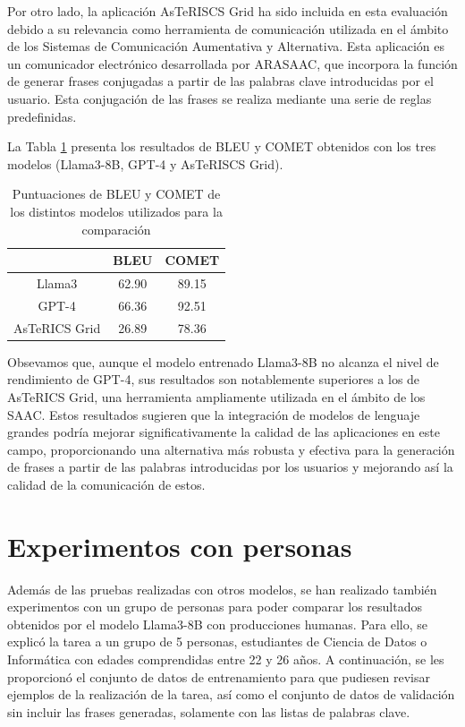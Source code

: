 \documentclass[11pt,spanish,listoffigures,listoftables]{tfgetsinf}
\begin{document}
Por otro lado, la aplicación AsTeRISCS Grid ha sido incluida en esta evaluación debido a su relevancia como herramienta de comunicación utilizada en el ámbito de los Sistemas de Comunicación Aumentativa y Alternativa. Esta aplicación es un comunicador electrónico desarrollada por ARASAAC, que incorpora la función de generar frases conjugadas a partir de las palabras clave introducidas por el usuario. Esta conjugación de las frases se realiza mediante una serie de reglas predefinidas.

La Tabla \ref{tab:comparacionFinal} presenta los resultados de BLEU y COMET obtenidos con los tres modelos (Llama3-8B, GPT-4 y AsTeRISCS Grid).

\begin{table}[!h]
\caption{Puntuaciones de BLEU y COMET de los distintos modelos utilizados para la comparación}
\begin{center}
\begin{tabular}{ c | c c }
	\ & BLEU & COMET \\
	\hline
	\hline
	Llama3 & 62.90 & 89.15  \\
	GPT-4 & 66.36 & 92.51\\
	AsTeRICS Grid & 26.89 & 78.36 \\

\end{tabular}
\end{center}
\label{tab:comparacionFinal}
\end{table}

Obsevamos que, aunque el modelo entrenado Llama3-8B no alcanza el nivel de rendimiento de GPT-4, sus resultados son notablemente superiores a los de AsTeRICS Grid, una herramienta ampliamente utilizada en el ámbito de los SAAC. Estos resultados sugieren que la integración de modelos de lenguaje grandes podría mejorar significativamente la calidad de las aplicaciones en este campo, proporcionando una alternativa más robusta y efectiva para la generación de frases a partir de las palabras introducidas por los usuarios y mejorando así la calidad de la comunicación de estos.

\section{Experimentos con personas}

Además de las pruebas realizadas con otros modelos, se han realizado también experimentos con un grupo de personas para poder comparar los resultados obtenidos por el modelo Llama3-8B con producciones humanas. Para ello, se explicó la tarea a un grupo de 5 personas, estudiantes de Ciencia de Datos o Informática con edades comprendidas entre 22 y 26 años. A continuación, se les proporcionó el conjunto de datos de entrenamiento para que pudiesen revisar ejemplos de la realización de la tarea, así como el conjunto de datos de validación sin incluir las frases generadas, solamente con las listas de palabras clave.
\end{document}
